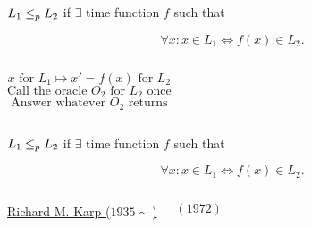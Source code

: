 \begin{frame}
  \begin{definition}
	\begin{center}
	  $L_1 \le_{p} L_2$ if $\exists$  time function $f$ such that
	\end{center}
	\[
	  \forall x: x \in L_1 \iff f(x) \in L_2.
	\]
  \end{definition}

  \begin{columns}
	  \begin{center}
		\pause
		\[
		  x \text{ for } L_1 \mapsto x' = f(x) \text{ for } L_2
		\]
		\pause
		\[
		  \text{Call the oracle } O_2 \text{ for } L_2 \text{ once}
		\]
		\pause
		\[
		  \text{Answer whatever } O_2 \text{ returns}
		\]
	  \end{center}
	  \pause
  \end{columns}
\end{frame}

\begin{frame}
  \begin{definition}
	\begin{center}
	  $L_1 \le_{p} L_2$ if $\exists$  time function $f$ such that
	\end{center}
	\[
	  \forall x: x \in L_1 \iff f(x) \in L_2.
	\]
  \end{definition}

  \pause
  \begin{center}
  \end{center}

  \pause
  \begin{columns}
	  \begin{center}
		\href{https://en.wikipedia.org/wiki/Richard\_M.\_Karp}{Richard M. Karp ($1935 \sim$)}
	  \end{center}
	  \begin{center}
		\href{https://people.eecs.berkeley.edu/~luca/cs172/karp.pdf}{$(1972)$}
	  \end{center}
  \end{columns}
\end{frame}

